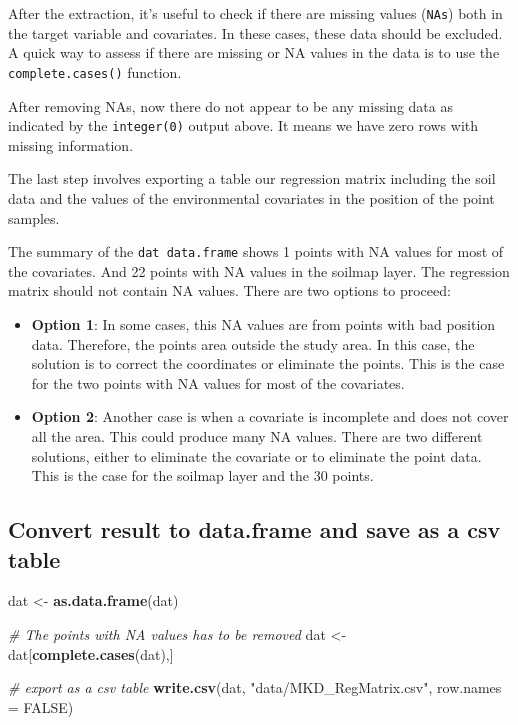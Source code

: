 \documentclass[10pt,b5paper,]{book}
\newenvironment{Shaded}{\begin{snugshade}}{\end{snugshade}}
\newcommand{\CommentTok}[1]{\textcolor[rgb]{0.56,0.35,0.01}{\textit{#1}}}
\newcommand{\DataTypeTok}[1]{\textcolor[rgb]{0.13,0.29,0.53}{#1}}
\newcommand{\KeywordTok}[1]{\textcolor[rgb]{0.13,0.29,0.53}{\textbf{#1}}}
\newcommand{\NormalTok}[1]{#1}
\newcommand{\OtherTok}[1]{\textcolor[rgb]{0.56,0.35,0.01}{#1}}
\newcommand{\StringTok}[1]{\textcolor[rgb]{0.31,0.60,0.02}{#1}}
\theoremstyle{definition}
\theoremstyle{definition}
\theoremstyle{definition}
\theoremstyle{remark}
\begin{document}
After the extraction, it's useful to check if there are missing values
(\texttt{NAs}) both in the target variable and covariates. In these
cases, these data should be excluded. A quick way to assess if there are
missing or NA values in the data is to use the \texttt{complete.cases()}
function.

After removing NAs, now there do not appear to be any missing data as
indicated by the \texttt{integer(0)} output above. It means we have zero
rows with missing information.

The last step involves exporting a table our regression matrix including
the soil data and the values of the environmental covariates in the
position of the point samples.

The summary of the \texttt{dat\ data.frame} shows 1 points with NA
values for most of the covariates. And 22 points with NA values in the
soilmap layer. The regression matrix should not contain NA values. There
are two options to proceed:

\begin{itemize}
\item
  \textbf{Option 1}: In some cases, this NA values are from points with
  bad position data. Therefore, the points area outside the study area.
  In this case, the solution is to correct the coordinates or eliminate
  the points. This is the case for the two points with NA values for
  most of the covariates.
\item
  \textbf{Option 2}: Another case is when a covariate is incomplete and
  does not cover all the area. This could produce many NA values. There
  are two different solutions, either to eliminate the covariate or to
  eliminate the point data. This is the case for the soilmap layer and
  the 30 points.
\end{itemize}

\hypertarget{convert-result-to-data.frame-and-save-as-a-csv-table}{%
\subsection{Convert result to data.frame and save as a csv
table}\label{convert-result-to-data.frame-and-save-as-a-csv-table}}

\begin{Shaded}
\begin{Highlighting}[]
\NormalTok{dat <-}\StringTok{ }\KeywordTok{as.data.frame}\NormalTok{(dat)}

\CommentTok{# The points with NA values has to be removed }
\NormalTok{dat <-}\StringTok{ }\NormalTok{dat[}\KeywordTok{complete.cases}\NormalTok{(dat),]}

\CommentTok{# export as a csv table}
\KeywordTok{write.csv}\NormalTok{(dat, }\StringTok{"data/MKD_RegMatrix.csv"}\NormalTok{, }\DataTypeTok{row.names =} \OtherTok{FALSE}\NormalTok{)}
\end{Highlighting}
\end{Shaded}
\end{document}
